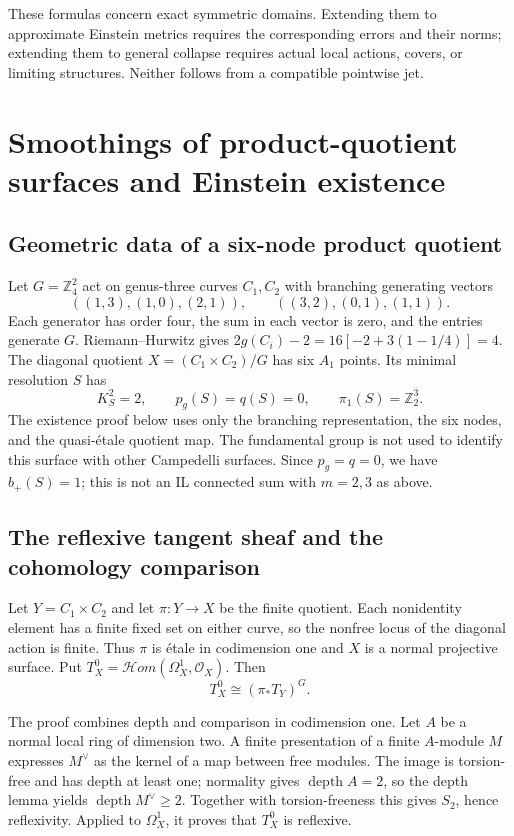 \documentclass[a4paper,11pt]{article}
\numberwithin{equation}{section}
\theoremstyle{definition}
\newcommand{\Z}{\mathbb Z}
\begin{document}
These formulas concern exact symmetric domains. Extending them to approximate Einstein metrics requires the corresponding errors and their norms; extending them to general collapse requires actual local actions, covers, or limiting structures. Neither follows from a compatible pointwise jet.

\section{Smoothings of product-quotient surfaces and Einstein existence}\label{sec:product-quotients}
\subsection{Geometric data of a six-node product quotient}
Let $G=\Z_4^2$ act on genus-three curves $C_1,C_2$ with branching generating vectors
\[
((1,3),(1,0),(2,1)),\qquad ((3,2),(0,1),(1,1)).
\]
Each generator has order four, the sum in each vector is zero, and the entries generate $G$. Riemann--Hurwitz gives
$2g(C_i)-2=16[-2+3(1-1/4)]=4$.
The diagonal quotient $X=(C_1\times C_2)/G$ has six $A_1$ points.
Its minimal resolution $S$ has
\[
K_S^2=2,\qquad p_g(S)=q(S)=0,\qquad \pi_1(S)=\Z_2^3.
\]
The existence proof below uses only the branching representation, the six nodes, and the quasi-\'etale quotient map.
The fundamental group is not used to identify this surface with other Campedelli surfaces.
Since $p_g=q=0$, we have $b_+(S)=1$; this is not an IL connected sum with $m=2,3$ as above.

\subsection{The reflexive tangent sheaf and the cohomology comparison}
Let $Y=C_1\times C_2$ and let $\pi:Y\to X$ be the finite quotient.
Each nonidentity element has a finite fixed set on either curve, so the nonfree locus of the diagonal action is finite.
Thus $\pi$ is \'etale in codimension one and $X$ is a normal projective surface.
Put $T_X^0=\mathcal Hom(\Omega_X^1,\mathcal O_X)$. Then
\begin{equation}\label{eq:reflexive}
T_X^0\cong(\pi_*T_Y)^G.
\end{equation}

The proof combines depth and comparison in codimension one. Let $A$ be a normal local ring of dimension two.
A finite presentation of a finite $A$-module $M$ expresses $M^\vee$ as the kernel of a map between free modules.
The image is torsion-free and has depth at least one; normality gives $\operatorname{depth}A=2$,
so the depth lemma yields $\operatorname{depth}M^\vee\ge2$.
Together with torsion-freeness this gives $S_2$, hence reflexivity.
Applied to $\Omega_X^1$, it proves that $T_X^0$ is reflexive.
\end{document}
